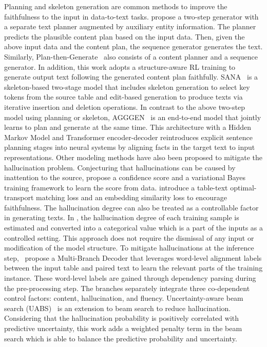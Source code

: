 \vspace{-0.5em} 
Planning and skeleton generation are common methods to improve the faithfulness to the input in data-to-text tasks. 
 propose a two-step generator with a separate text planner augmented by auxiliary entity information.
The planner predicts the plausible content plan based on the input data. Then, given the above input data and the content plan, the sequence generator generates the text. 
Similarly, Plan-then-Generate~ also consists of a content planner and a sequence generator.
In addition, this work adopts a structure-aware RL training to generate output text following the generated content plan faithfully. 
SANA~ is a skeleton-based two-stage model that includes skeleton generation to select key tokens from the source table and edit-based generation to produce texts via iterative insertion and deletion operations.
In contrast to the above two-step model using planning or skeleton, AGGGEN~ is an end-to-end model that jointly learns to plan and generate at the same time.
This architecture with a Hidden Markov Model and Transformer encoder-decoder reintroduces explicit sentence planning stages into neural systems by aligning facts in the target text to input representations.
Other modeling methods have also been proposed to mitigate the hallucination problem.
Conjecturing that hallucinations can be caused by inattention to the source,  propose a confidence score and a variational Bayes training framework to learn the score from data.  
 introduce a table-text optimal-transport matching loss and an embedding similarity loss to encourage faithfulness.
The hallucination degree can also be treated as a controllable factor in generating texts.
In , the hallucination degree of each training sample is estimated and converted into a categorical value which is a part of the inputs as a controlled setting. 
This approach does not require the dismissal of any input or modification of the model structure.
To mitigate hallucinations at the inference step,~ propose a Multi-Branch Decoder that leverages word-level alignment labels between the input table and paired text to learn the relevant parts of the training instance. These word-level labels are gained through dependency parsing during the pre-processing step.
The branches separately integrate three co-dependent control factors: content, hallucination, and fluency.
Uncertainty-aware beam search (UABS)~ is an extension to beam search to reduce hallucination. Considering that the hallucination probability is positively correlated with predictive uncertainty, this work adds a weighted penalty term in the beam search which is able to balance the predictive probability and uncertainty. 

